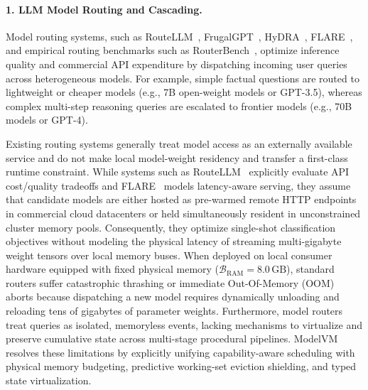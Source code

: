 \paragraph{1. LLM Model Routing and Cascading.}
Model routing systems, such as RouteLLM~\cite{ong2024routellm}, FrugalGPT~\cite{chen2023frugalgpt}, HyDRA~\cite{hydra2026}, FLARE~\cite{flare2026}, and empirical routing benchmarks such as RouterBench~\cite{hu2024routerbench}, optimize inference quality and commercial API expenditure by dispatching incoming user queries across heterogeneous models. For example, simple factual questions are routed to lightweight or cheaper models (e.g., 7B open-weight models or GPT-3.5), whereas complex multi-step reasoning queries are escalated to frontier models (e.g., 70B models or GPT-4).

Existing routing systems generally treat model access as an externally available service and do not make local model-weight residency and transfer a first-class runtime constraint. While systems such as RouteLLM~\cite{ong2024routellm} explicitly evaluate API cost/quality tradeoffs and FLARE~\cite{flare2026} models latency-aware serving, they assume that candidate models are either hosted as pre-warmed remote HTTP endpoints in commercial cloud datacenters or held simultaneously resident in unconstrained cluster memory pools. Consequently, they optimize single-shot classification objectives without modeling the physical latency of streaming multi-gigabyte weight tensors over local memory buses. When deployed on local consumer hardware equipped with fixed physical memory ($\mathcal{B}_{\text{RAM}} = 8.0\,\text{GB}$), standard routers suffer catastrophic thrashing or immediate Out-Of-Memory (OOM) aborts because dispatching a new model requires dynamically unloading and reloading tens of gigabytes of parameter weights. Furthermore, model routers treat queries as isolated, memoryless events, lacking mechanisms to virtualize and preserve cumulative state across multi-stage procedural pipelines. ModelVM resolves these limitations by explicitly unifying capability-aware scheduling with physical memory budgeting, predictive working-set eviction shielding, and typed state virtualization.


